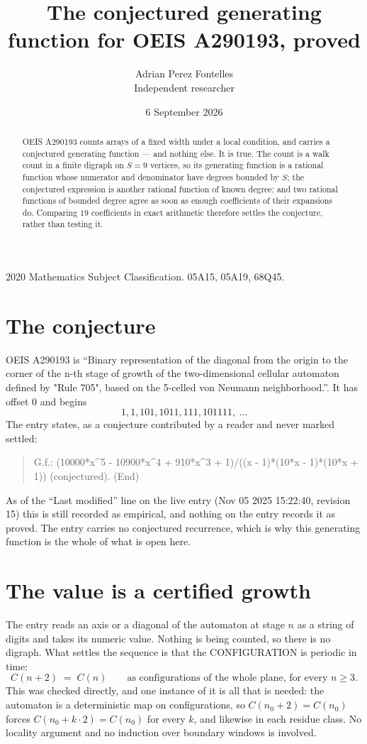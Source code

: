 \documentclass[11pt,a4paper]{article}
\title{The conjectured generating function for OEIS A290193, proved}
\author{Adrian Perez Fontelles\\ \small Independent researcher}
\date{6 September 2026}
\theoremstyle{plain}
\theoremstyle{definition}
\begin{document}
\maketitle

\begin{abstract}
OEIS A290193 counts arrays of a fixed width under a local condition, and carries a conjectured
generating function --- and nothing else. It is true. The count is a walk count in a finite
digraph on $S=9$ vertices, so its generating function is a rational function whose numerator
and denominator have degrees bounded by $S$; the conjectured expression is another rational
function of known degree; and two rational functions of bounded degree agree as soon as enough
coefficients of their expansions do. Comparing $19$ coefficients in exact arithmetic
therefore settles the conjecture, rather than testing it.
\end{abstract}

\noindent\small 2020 Mathematics Subject Classification. 05A15, 05A19, 68Q45.\normalsize

\section{The conjecture}

OEIS A290193 is ``Binary representation of the diagonal from the origin to the corner of the n-th stage of growth of the two-dimensional cellular automaton defined by "Rule 705", based on the 5-celled von Neumann neighborhood.''. It has offset $0$ and begins
\[
1, 1, 101, 1011, 111, 101111,\ \dots
\]
The entry states, as a conjecture contributed by a reader and never marked settled:
\begin{quote}
G.f.: (10000*x\^{}5 - 10900*x\^{}4 + 910*x\^{}3 + 1)/((x - 1)*(10*x - 1)*(10*x + 1)) (conjectured). (End)
\end{quote}
As of the ``Last modified'' line on the live entry (Nov 05 2025 15:22:40, revision 15) this is still
recorded as empirical, and nothing on the entry records it as proved. The entry carries no
conjectured recurrence, which is why this generating function is the whole of what is open
here.


\section{The value is a certified growth}

The entry reads an axis or a diagonal of the automaton at stage $n$ as a string of digits and
takes its numeric value. Nothing is being counted, so there is no digraph. What settles the
sequence is that the CONFIGURATION is periodic in time:
\[
C(n+2)\;=\;C(n)\qquad\text{as configurations of the whole plane, for every } n\ge 3.
\]
This was checked directly, and one instance of it is all that is needed: the automaton is a
deterministic map on configurations, so $C(n_0+2)=C(n_0)$ forces $C(n_0+k\cdot2)=C(n_0)$ for
every $k$, and likewise in each residue class. No locality argument and no induction over
boundary windows is involved.
\end{document}
